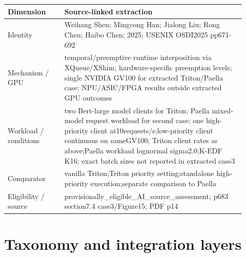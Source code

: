 \documentclass[12pt,a4paper]{article}
\begin{document}
{\small\begin{longtable}{>{\raggedright\arraybackslash}p{0.22\linewidth}>{\raggedright\arraybackslash}p{0.7\linewidth}}
\toprule
Dimension & Source-linked extraction\\\midrule
\endhead
Identity & Weihang Shen; Mingcong Han; Jialong Liu; Rong Chen; Haibo Chen; 2025; USENIX OSDI2025 pp671-692\\
Mechanism /\allowbreak{} GPU & temporal/\allowbreak{}preemptive runtime interposition via XQueue/\allowbreak{}XShim; hardware-specific preemption levels; single NVIDIA GV100 for extracted Triton/\allowbreak{}Paella case; NPU/\allowbreak{}ASIC/\allowbreak{}FPGA results outside extracted GPU outcomes\\
Workload /\allowbreak{} conditions & two Bert-large model clients for Triton; Paella mixed-model request workload for second case; one high-priority client at10requests/\allowbreak{}s;low-priority client continuous on sameGV100; Triton client rates as above;Paella workload lognormal sigma2.0;K-EDF K16; exact batch sizes not reported in extracted case3\\
Comparator & vanilla Triton;Triton priority setting;standalone high-priority execution;separate comparison to Paella\\
Eligibility /\allowbreak{} source & provisionally\_\allowbreak{}eligible\_\allowbreak{}AI\_\allowbreak{}source\_\allowbreak{}assessment; p683 section7.4 case3/\allowbreak{}Figure15; PDF p14\\
\bottomrule
\end{longtable}}


\section{Taxonomy and integration layers}
\end{document}
